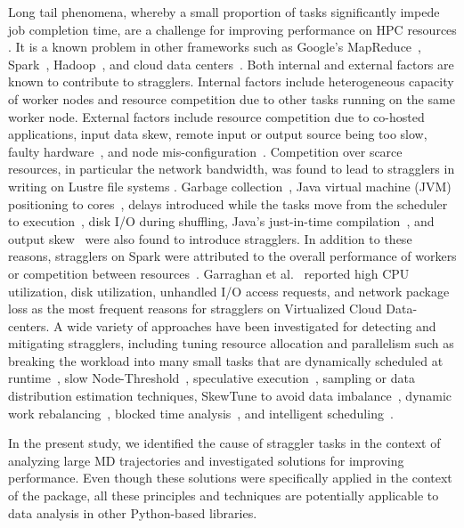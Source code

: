Long tail phenomena, whereby a small proportion of tasks significantly impede job completion time, are a challenge for improving performance on HPC resources \cite{Garraghan2016}.
It is a known problem in other frameworks such as Google's MapReduce~\cite{Dean2004}, Spark~\cite{Kyong2017,Ousterhout2017,Gittens2016}, Hadoop~\cite{Dean2004}, and cloud data centers~\cite{Schmidt2016}.
Both internal and external factors are known to contribute to stragglers. 
Internal factors include heterogeneous capacity of worker nodes and resource competition due to other tasks running on the same worker node.
External factors include resource competition due to co-hosted applications, input data skew, remote input or output source being too slow,  faulty hardware~\cite{Chen2014,Dean2004}, and node mis-configuration~\cite{Dean2004}.
Competition over scarce resources, in particular the network bandwidth, was found to lead to stragglers in writing on Lustre file systems \cite{Xie:2012aa}.
Garbage collection~\cite{Kyong2017,Ousterhout2017}, Java virtual machine (JVM) positioning to cores~\cite{Kyong2017}, delays introduced while the tasks move from the scheduler to execution~\cite{Gittens2016}, disk I/O during shuffling, Java's just-in-time compilation~\cite{Ousterhout2017}, and output skew~\cite{Ousterhout2017} were also found to introduce stragglers.
In addition to these reasons, stragglers on Spark were attributed to the overall performance of workers or competition between resources~\cite{Yang2016}.
Garraghan et al.~\cite{Garraghan2016} reported high CPU utilization, disk utilization, unhandled I/O access requests, and network package loss as the most frequent reasons for stragglers on Virtualized Cloud Data-centers.
A wide variety of approaches have been investigated for detecting and mitigating stragglers, including tuning resource allocation and parallelism such as breaking the workload into many small tasks that are dynamically scheduled at runtime~\cite{Rosen2012}, slow Node-Threshold~\cite{Dean2004}, speculative execution~\cite{Dean2004}, sampling or data distribution estimation techniques, SkewTune to avoid data imbalance~\cite{Kwon2012}, dynamic work rebalancing~\cite{Schmidt2016}, blocked time analysis~\cite{Ousterhout2015}, and intelligent scheduling~\cite{AWE-WQ2014}. 

In the present study, we identified the cause of straggler tasks in the context of analyzing large MD trajectories and investigated solutions for improving performance.
Even though these solutions were specifically applied in the context of the  package, all these principles and  techniques are potentially applicable to data analysis in other Python-based libraries.

